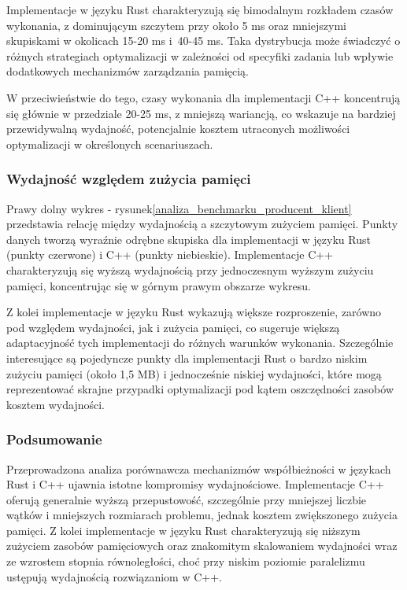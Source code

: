 Implementacje w języku Rust charakteryzują się bimodalnym rozkładem czasów wykonania, z dominującym szczytem przy około 5 ms oraz mniejszymi skupiskami w okolicach 15-20 ms i~40-45 ms. Taka dystrybucja może świadczyć o różnych strategiach optymalizacji w zależności od specyfiki zadania lub wpływie dodatkowych mechanizmów zarządzania pamięcią.

W przeciwieństwie do tego, czasy wykonania dla implementacji C++ koncentrują się głównie w przedziale 20-25 ms, z mniejszą wariancją, co wskazuje na bardziej przewidywalną wydajność, potencjalnie kosztem utraconych możliwości optymalizacji w określonych scenariuszach.

\subsubsection{Wydajność względem zużycia pamięci}
Prawy dolny wykres - rysunek\ref{analiza_benchmarku_producent_klient} przedstawia relację między wydajnością a szczytowym zużyciem pamięci. Punkty danych tworzą wyraźnie odrębne skupiska dla implementacji w języku Rust (punkty czerwone) i C++ (punkty niebieskie). Implementacje C++ charakteryzują się wyższą wydajnością przy jednoczesnym wyższym zużyciu pamięci, koncentrując się w górnym prawym obszarze wykresu.

Z kolei implementacje w języku Rust wykazują większe rozproszenie, zarówno pod względem wydajności, jak i zużycia pamięci, co sugeruje większą adaptacyjność tych implementacji do różnych warunków wykonania. Szczególnie interesujące są pojedyncze punkty dla implementacji Rust o bardzo niskim zużyciu pamięci (około 1,5 MB) i jednocześnie niskiej wydajności, które mogą reprezentować skrajne przypadki optymalizacji pod kątem oszczędności zasobów kosztem wydajności.

\subsubsection{Podsumowanie}
Przeprowadzona analiza porównawcza mechanizmów współbieżności w językach Rust i C++ ujawnia istotne kompromisy wydajnościowe. Implementacje C++ oferują generalnie wyższą przepustowość, szczególnie przy mniejszej liczbie wątków i mniejszych rozmiarach problemu, jednak kosztem zwiększonego zużycia pamięci. Z kolei implementacje w języku Rust charakteryzują się niższym zużyciem zasobów pamięciowych oraz znakomitym skalowaniem wydajności wraz ze wzrostem stopnia równoległości, choć przy niskim poziomie paralelizmu ustępują wydajnością rozwiązaniom w C++.

